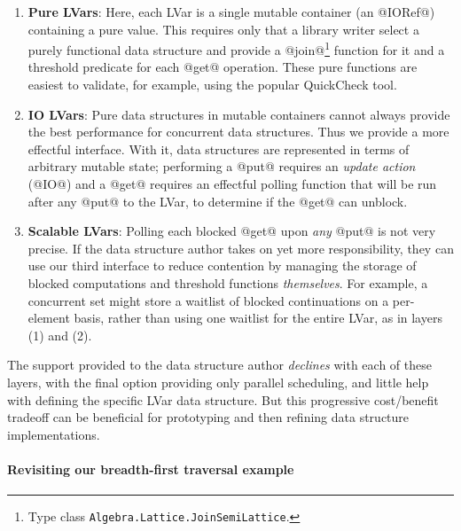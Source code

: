 \begin{enumerate}
\item {\bf Pure LVars}: Here, each LVar is a single mutable
  container (an @IORef@) containing a pure value.  This requires only
  that a library writer select a purely functional data structure and
  provide a @join@\footnote{Type class
    \lstinline|Algebra.Lattice.JoinSemiLattice|.} function for it and a threshold
  predicate for each @get@ operation.  These pure functions are
  easiest to validate, for example, using the popular QuickCheck \cite{quickcheck} tool.

\item {\bf IO LVars}: Pure data structures in mutable containers
  cannot always provide the best performance for concurrent data
  structures.
  Thus we provide a more effectful interface.  With it, data
  structures are represented in terms of arbitrary mutable state; performing a
  @put@ requires an {\em update action} (@IO@) and a @get@ requires an
  effectful polling function that will be run after any @put@ to the
  LVar, to determine if the @get@ can unblock.

\item {\bf Scalable LVars}: Polling each blocked @get@ upon {\em any}
  @put@ is not very precise.  If the data structure author takes on yet more
  responsibility, they can use our third interface to reduce contention by
  managing
   the storage of blocked computations and threshold functions {\em
     themselves}.  
  For example, a concurrent set
  might store a waitlist of blocked continuations on a per-element basis,
  rather than using one waitlist for the entire LVar, as in layers (1) and (2).
\end{enumerate}

\noindent The support provided to the data structure author {\em declines} with each of
these layers, with the final option providing only parallel scheduling,
and little help with defining the specific LVar data structure.  But
this progressive cost/benefit tradeoff can be beneficial for
prototyping and then refining data structure implementations.  



\paragraph{Revisiting our breadth-first traversal example}


